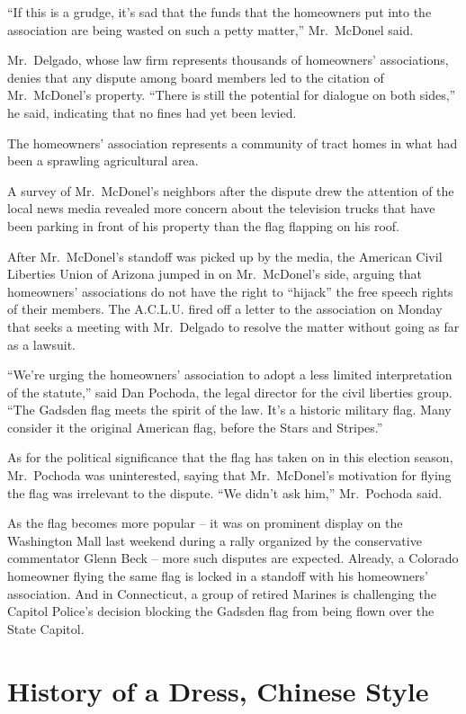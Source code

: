 ﻿\documentclass[12pt]{article}
\begin{document}
``If this is a grudge, it's sad that the funds that the homeowners put into the association are
being wasted on such a petty matter,'' Mr.~McDonel said.

Mr.~Delgado, whose law firm represents thousands of homeowners' associations, denies that any
dispute among board members led to the citation of Mr.~McDonel's property. ``There is still the
potential for dialogue on both sides,'' he said, indicating that no fines had yet been levied.

The homeowners' association represents a community of tract homes in what had been a sprawling
agricultural area.

A survey of Mr.~McDonel's neighbors after the dispute drew the attention of the local news media
revealed more concern about the television trucks that have been parking in front of his property
than the flag flapping on his roof.

After Mr.~McDonel's standoff was picked up by the media, the American Civil Liberties Union of
Arizona jumped in on Mr.~McDonel's side, arguing that homeowners' associations do not have the right
to ``hijack'' the free speech rights of their members. The A.C.L.U. fired off a letter to the
association on Monday that seeks a meeting with Mr.~Delgado to resolve the matter without going as
far as a lawsuit.

``We're urging the homeowners' association to adopt a less limited interpretation of the statute,''
said Dan Pochoda, the legal director for the civil liberties group. ``The Gadsden flag meets the
spirit of the law. It's a historic military flag. Many consider it the original American flag,
before the Stars and Stripes.''

As for the political significance that the flag has taken on in this election season, Mr.~Pochoda
was uninterested, saying that Mr.~McDonel's motivation for flying the flag was irrelevant to the
dispute. ``We didn't ask him,'' Mr.~Pochoda said.

As the flag becomes more popular -- it was on prominent display on the Washington Mall last weekend
during a rally organized by the conservative commentator Glenn Beck -- more such disputes are
expected. Already, a Colorado homeowner flying the same flag is locked in a standoff with his
homeowners' association. And in Connecticut, a group of retired Marines is challenging the Capitol
Police's decision blocking the Gadsden flag from being flown over the State Capitol.

\pagebreak
\section{History of a Dress, Chinese Style}
\end{document}
